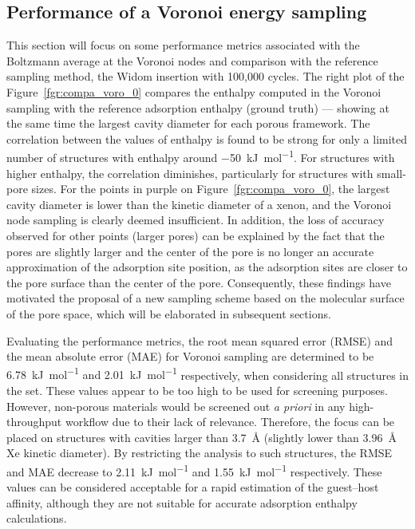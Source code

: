 \documentclass[main]{subfiles}
\begin{document}
\subsection{Performance of a Voronoi energy sampling}

This section will focus on some performance metrics associated with the Boltzmann average at the Voronoi nodes and comparison with the reference sampling method, the Widom insertion with 100,000 cycles. The right plot of the Figure~\ref{fgr:compa_voro_0} compares the enthalpy computed in the Voronoi sampling with the reference adsorption enthalpy (ground truth) --- showing at the same time the largest cavity diameter for each porous framework. The correlation between the values of enthalpy is found to be strong for only a limited number of structures with enthalpy around \SI{-50}{\kilo\joule\per\mole}. For structures with higher enthalpy, the correlation diminishes, particularly for structures with small-pore sizes. For the points in purple on Figure~\ref{fgr:compa_voro_0}, the largest cavity diameter is lower than the kinetic diameter of a xenon, and the Voronoi node sampling is clearly deemed insufficient. In addition, the loss of accuracy observed for other points (larger pores) can be explained by the fact that the pores are slightly larger and the center of the pore is no longer an accurate approximation of the adsorption site position, as the adsorption sites are closer to the pore surface than the center of the pore. Consequently, these findings have motivated the proposal of a new sampling scheme based on the molecular surface of the pore space, which will be elaborated in subsequent sections.

Evaluating the performance metrics, the root mean squared error (RMSE) {and the mean absolute error (MAE) for Voronoi sampling are determined to be \SI{6.78}{\kilo\joule\per\mole} and \SI{2.01}{\kilo\joule\per\mole}} respectively, when considering all structures in the set. These values appear to be too high to be used for screening purposes. However, non-porous materials would be screened out \emph{a priori} in any high-throughput workflow due to their lack of relevance. Therefore, the focus can be placed on structures with cavities larger than \SI{3.7}{\angstrom} (slightly lower than \SI{3.96}{\angstrom} Xe kinetic diameter). By restricting the analysis to such structures, {the RMSE and MAE decrease to \SI{2.11}{\kilo\joule\per\mole} and \SI{1.55}{\kilo\joule\per\mole} respectively}. These values can be considered acceptable for a rapid estimation of the guest--host affinity, although they are not suitable for accurate adsorption enthalpy calculations.
\end{document}
